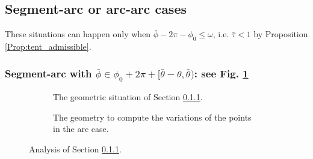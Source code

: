\documentclass[reqno]{amsart}
\theoremstyle{definition} \newtheorem{definition}{Definition}[section]
\theoremstyle{definition} \newtheorem{remark}[definition]{Remark}
\theoremstyle{plain} \newtheorem{lemma}[definition]{Lemma}
\theoremstyle{plain} \newtheorem{proposition}[definition]{Proposition}
\theoremstyle{plain} \newtheorem{theorem}[definition]{Theorem}
\theoremstyle{plain} \newtheorem{corollary}[definition]{Corollary}
\theoremstyle{definition} \newtheorem{example}[definition]{Example}
\theoremstyle{plain} \newtheorem{claim}[clai]{Claim}
\theoremstyle{definition} \newtheorem{assumption}[definition]{Assumption}
\theoremstyle{definition} \newtheorem{observation}[definition]{Observation}
\newcommand{\1}{\mathbbm 1}
\renewcommand{\i}{\imath}
\numberwithin{equation}{section} %
\theoremstyle{plain} \newtheorem*{theorem*}{Theorem}
\theoremstyle{plain} \newtheorem{mthm}[maintheorem]{Main Theorem}
\theoremstyle{plain} \newtheorem*{mthm*}{Main Theorem}
\theoremstyle{plain} \newtheorem*{conjecture*}{Conjecture}
\theoremstyle{plain} \newtheorem{conjecture}[definition]{Conjecture}
\theoremstyle{plain} \newtheorem*{problem*}{Problem}
\begin{document}
\subsection{Segment-arc or arc-arc cases}
\label{Ss:arc-arc}


These situations can happen only when $\bar \phi - 2\pi - \phi_0 \leq \omega$, i.e. $\bar \tau < 1$ by Proposition \ref{Prop:tent_admissible}.

%
%
%
%


\subsubsection{Segment-arc with $\bar \phi \in \phi_0 + 2\pi + [\bar \theta - \theta,\bar \theta)$: see Fig. \ref{Fig:segm_arc_2}}
\label{Sss:segm_arc_2}


\begin{figure}
\begin{subfigure}{.475\textwidth}
\resizebox{\textwidth}{!}{}
\caption{The geometric situation of Section \ref{Sss:segm_arc_2}.}
\label{Fig:segm_arc_2}
\end{subfigure}
\hfill
\begin{subfigure}{.475\textwidth}
\resizebox{\textwidth}{!}{}
\caption{The geometry to compute the variations of the points in the arc case.}
\label{Fig:segm_arc_2_2}
\end{subfigure}
\caption{Analysis of Section \ref{Sss:segm_arc_2}.}
\label{Fig:segm_arc_2_tot}
\end{figure}
\end{document}
